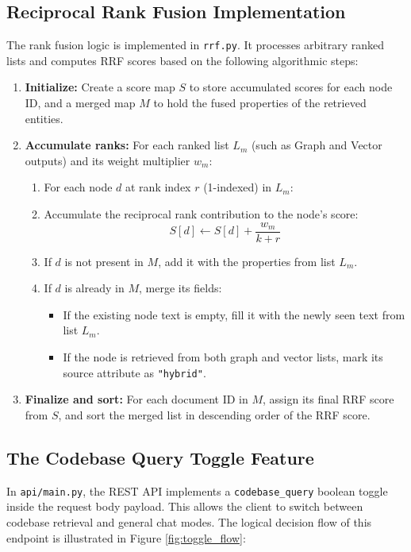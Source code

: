 \documentclass[12pt,a4paper,oneside]{report}
\begin{document}
\subsection{Reciprocal Rank Fusion Implementation}
The rank fusion logic is implemented in \texttt{rrf.py}. It processes arbitrary ranked lists and computes RRF scores based on the following algorithmic steps:
\begin{enumerate}
    \item \textbf{Initialize:} Create a score map $S$ to store accumulated scores for each node ID, and a merged map $M$ to hold the fused properties of the retrieved entities.
    \item \textbf{Accumulate ranks:} For each ranked list $L_m$ (such as Graph and Vector outputs) and its weight multiplier $w_m$:
    \begin{enumerate}
        \item For each node $d$ at rank index $r$ (1-indexed) in $L_m$:
        \item Accumulate the reciprocal rank contribution to the node's score:
        $$S[d] \leftarrow S[d] + \frac{w_m}{k + r}$$
        \item If $d$ is not present in $M$, add it with the properties from list $L_m$.
        \item If $d$ is already in $M$, merge its fields:
        \begin{itemize}
            \item If the existing node text is empty, fill it with the newly seen text from list $L_m$.
            \item If the node is retrieved from both graph and vector lists, mark its source attribute as \texttt{"hybrid"}.
        \end{itemize}
    \end{enumerate}
    \item \textbf{Finalize and sort:} For each document ID in $M$, assign its final RRF score from $S$, and sort the merged list in descending order of the RRF score.
\end{enumerate}

\subsection{The Codebase Query Toggle Feature}
In \texttt{api/main.py}, the REST API implements a \texttt{codebase\_query} boolean toggle inside the request body payload. This allows the client to switch between codebase retrieval and general chat modes. The logical decision flow of this endpoint is illustrated in Figure \ref{fig:toggle_flow}:
\end{document}

